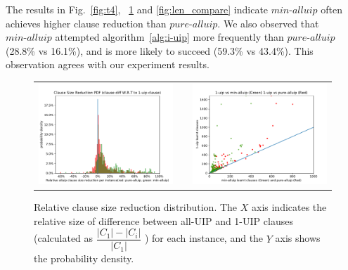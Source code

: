 \documentclass[runningheads]{llncs}
\newcommand{\fss}[2]{\fontsize{#1}{#2}\selectfont}
\newcommand{\allUipPure}{\textit{pure-alluip}\xspace}
\newcommand{\allUipMin}{\textit{min-alluip}\xspace}
\begin{document}
The results in Fig.~\ref{fig:t4}, ~\ref{fig:len_pdf} and
\ref{fig:len_compare} indicate $\allUipMin$ often achieves higher
clause reduction than $\allUipPure$. We also observed that
$\allUipMin$ attempted algorithm~\ref{alg:i-uip} more frequently than
$\allUipPure$ (28.8\% vs 16.1\%), and is more likely to succeed
(59.3\% vs 43.4\%). This observation agrees with our experiment
results.

\begin{figure}[t!]
{\fss{8pt}{10pt}
\begin{tabular}[t]{l c l}
  
  \begin{minipage}[t]{0.5\textwidth}
   \includegraphics[width=\textwidth]{figures/clause_reduction_PDF.pdf}
   \caption{Relative clause size reduction distribution. The $X$ axis
      indicates the relative size of difference between all-UIP and
      1-UIP clauses (calculated as
      $\dfrac{|C_1|-|C_i|}{|C_1|}$ ) for
      each instance, and the $Y$ axis shows the probability density.}
       \label{fig:len_pdf}
  \end{minipage}
  & &
  \begin{minipage}[t]{0.5\textwidth}
    \includegraphics[width=\textwidth]{figures/clause_size_compare.pdf}

\end{minipage}
\end{tabular}}
\end{figure}
\end{document}
